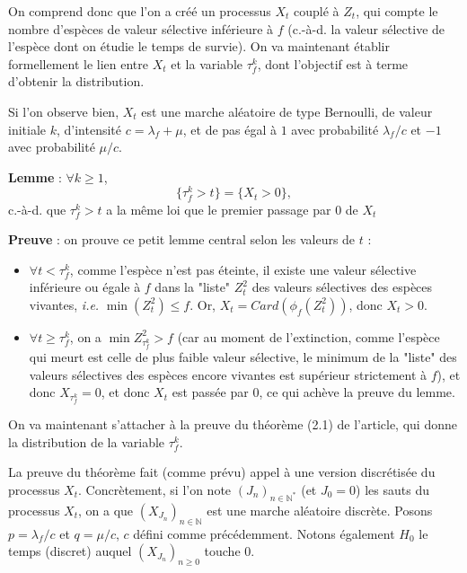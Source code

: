 \documentclass[12pt,a4paper]{article}
\begin{document}
On comprend donc que l'on a créé un processus $X_t$ couplé à $Z_t$, qui compte le nombre d'espèces de valeur sélective inférieure à $f$ (c.-à-d. la valeur sélective de l'espèce dont on étudie le temps de survie). On va maintenant établir formellement le lien entre $X_t$ et la variable $\tau_f^k$, dont l'objectif est à terme d'obtenir la distribution. \par 

Si l'on observe bien, $X_t$ est une marche aléatoire de type Bernoulli, de valeur initiale $k$, d'intensité $c = \lambda_f+\mu$, et de pas égal à $1$ avec probabilité $\lambda_f/c$ et $-1$ avec probabilité $\mu/c$. \par 


\textbf{Lemme} : $\forall k \geq 1$, $$ \{\tau_f^k > t\} = \{X_t > 0\},$$ c.-à-d. que $ \tau_f^k > t$ a la même loi que le premier passage par 0 de $X_t$\par 

\textbf{Preuve} : on prouve ce petit lemme central selon les valeurs de $t$ : 
\begin{itemize}
    \item $\forall t < \tau_f^k$, comme l'espèce n'est pas éteinte, il existe une valeur sélective inférieure ou égale à $f$ dans la "liste" $Z_t^2$ des valeurs sélectives des espèces vivantes, \textit{i.e.} $\min(Z_t^2) \leq f$. Or, $X_t = Card(\phi_f(Z_t^2))$, donc $X_t > 0$.
    
    \item $\forall t \geq \tau_f^k$, on a $\min Z_{\tau_f^k}^2 > f$ (car au moment de l'extinction, comme l'espèce qui meurt est celle de plus faible valeur sélective, le minimum de la "liste" des valeurs sélectives des espèces encore vivantes est supérieur strictement à $f$), et donc $X_{\tau_f^k} = 0$, et donc $X_t$ est passée par $0$, ce qui achève la preuve du lemme.
\end{itemize}

On va maintenant s'attacher à la preuve du théorème (2.1) de l'article, qui donne la distribution de la variable $\tau_f^k$. \par 

La preuve du théorème fait (comme prévu) appel à une version discrétisée du processus $X_t$. Concrètement, si l'on note $(J_n)_{n \in \mathbb{N}^*}$ (et $J_0=0$) les sauts du processus $X_t$, on a que $(X_{J_n})_{n \in \mathbb{N}}$ est une marche aléatoire discrète. Posons $p=\lambda_f/c$ et $q=\mu/c$, $c$ défini comme précédemment. Notons également $H_0$ le temps (discret) auquel $(X_{J_n})_{n \geq 0}$ touche $0$. 
\end{document}
